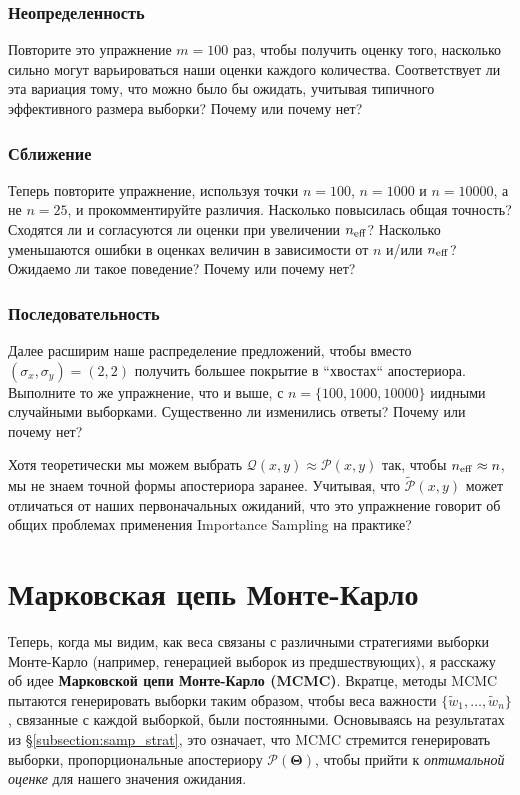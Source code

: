 \documentclass[12pt, titlepage]{article}
\newcommand{\params}{\ensuremath{\boldsymbol\Theta}}
\newcommand{\posterior}{\ensuremath{\mathcal{P}}}
\newcommand{\proposal}{\ensuremath{\mathcal{Q}}}
\begin{document}
\subsubsection*{Неопределенность}

Повторите это упражнение $m=100$ раз, чтобы получить оценку того, насколько сильно могут варьироваться наши оценки каждого количества. Соответствует ли эта вариация тому, что можно было бы ожидать, учитывая  типичного эффективного размера выборки? Почему или почему нет?

\subsubsection*{Сближение}

Теперь повторите упражнение, используя точки $n=100$, $n=1000$ и $n=10000$, а не $n=25$, и прокомментируйте различия. Насколько повысилась общая точность? Сходятся ли и согласуются ли оценки при увеличении $n_{\rm eff}$? Насколько уменьшаются ошибки в оценках величин в зависимости от $n$ и/или $n_{\rm eff}$? Ожидаемо ли такое поведение? Почему или почему нет?

\subsubsection*{Последовательность}

Далее расширим наше распределение предложений, чтобы вместо $(\sigma_x,\sigma_y)=(2,2)$ получить большее покрытие в ``хвостах`` апостериора. Выполните то же упражнение, что и выше, с $n=\{100,1000,10000\}$ иидными случайными выборками. Существенно ли изменились ответы? Почему или почему нет?

Хотя теоретически мы можем выбрать $\proposal(x,y)\approx \posterior(x,y)$ так, чтобы $n_{\rm eff} \approx n$, мы не знаем точной формы апостериора заранее. Учитывая, что $\tilde{\posterior}(x,y)$ может отличаться от наших первоначальных ожиданий, что это упражнение говорит об общих проблемах применения Importance Sampling на практике?

\section{Марковская цепь Монте-Карло} \label{sec:mcmc}

Теперь, когда мы видим, как веса связаны с различными стратегиями выборки Монте-Карло (например, генерацией выборок из предшествующих), я расскажу об идее \textbf{Марковской цепи Монте-Карло (MCMC)}. Вкратце, методы MCMC пытаются генерировать выборки таким образом, чтобы веса важности $\{ \tilde{w}_1, \dots, \tilde{w}_n \}$, связанные с каждой выборкой, были постоянными. Основываясь на результатах из \S\ref{subsection:samp_strat}, это означает, что MCMC стремится генерировать выборки, пропорциональные апостериору $\posterior(\params)$, чтобы прийти к \textit{оптимальной оценке} для нашего значения ожидания.
\end{document}
